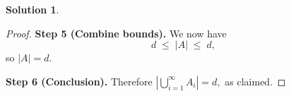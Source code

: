 \documentclass[12pt]{article}
\theoremstyle{definition} %
\newtheorem{solution}{Solution}
\theoremstyle{plain} %
\begin{document}
\begin{solution}
\begin{proof}
        \medskip
        \textbf{Step 5 (Combine bounds).}
        We now have
        \[
           d \;\le\; \lvert A\rvert \;\le\; d,
        \]
        so $\lvert A\rvert=d$.
        
        \medskip
        \textbf{Step 6 (Conclusion).}
        Therefore
        \(
          \displaystyle
          \left\lvert\bigcup_{i=1}^{\infty} A_i\right\rvert=d,
        \)
        as claimed.
        \end{proof} 
    \end{solution}
\end{document}
